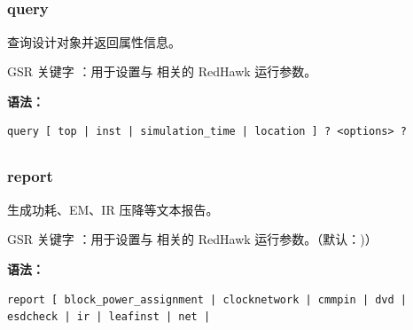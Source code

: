 \subsection{}
\subsubsection*{query}

查询设计对象并返回属性信息。

GSR 关键字 ：用于设置与  相关的 RedHawk 运行参数。

\textbf{语法：}
\begin{lstlisting}
query [ top | inst | simulation_time | location ] ? <options> ?
\end{lstlisting}

\subsection{}
\subsubsection*{report}

生成功耗、EM、IR 压降等文本报告。

GSR 关键字 ：用于设置与  相关的 RedHawk 运行参数。（默认：)）

\textbf{语法：}
\begin{lstlisting}
report [ block_power_assignment | clocknetwork | cmmpin | dvd | esdcheck | ir | leafinst | net |
\end{lstlisting}


